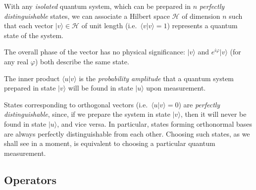 \documentclass[fleqn]{article}
\newenvironment{idea}{\noindent}{\medskip}
\begin{document}
\begin{idea}

With any \emph{isolated} quantum system, which can be prepared in \(n\) \emph{perfectly distinguishable} states, we can associate a Hilbert space \(\mathcal{H}\) of dimension \(n\) such that each vector \(|v\rangle\in\mathcal{H}\) of unit length (i.e.~\(\langle v|v\rangle =1\)) represents a quantum state of the system.

The overall phase of the vector has no physical significance: \(|v\rangle\) and \(e^{i\varphi}|v\rangle\) (for any real \(\varphi\)) both describe the same state.

The inner product \(\langle u|v\rangle\) is the \emph{probability amplitude} that a quantum system prepared in state \(|v\rangle\) will be found in state \(|u\rangle\) upon measurement.

States corresponding to orthogonal vectors (i.e.~\(\langle u|v\rangle=0\)) are \emph{perfectly distinguishable}, since, if we prepare the system in state \(|v\rangle\), then it will never be found in state \(|u\rangle\), and vice versa.
In particular, states forming orthonormal bases are always perfectly distinguishable from each other.
Choosing such states, as we shall see in a moment, is equivalent to choosing a particular quantum measurement.

\end{idea}

\hypertarget{operators}{%
\subsection{Operators}\label{operators}}
\end{document}
